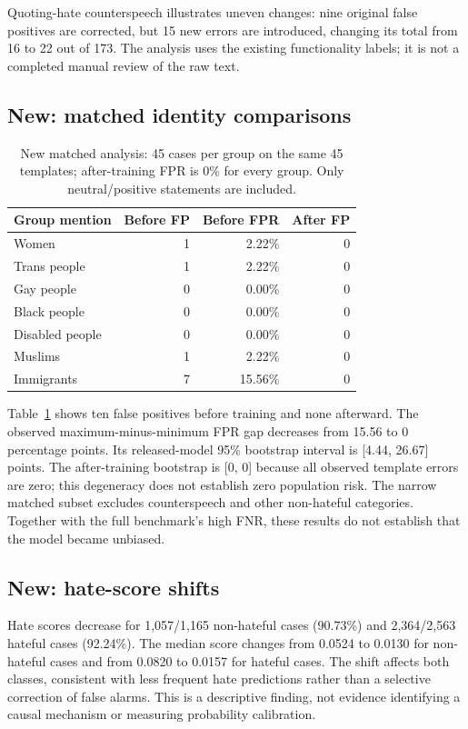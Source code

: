 \documentclass[11pt]{article}
\begin{document}
Quoting-hate counterspeech illustrates uneven changes: nine original false positives are corrected, but 15 new errors are introduced, changing its total from 16 to 22 out of 173. The analysis uses the existing functionality labels; it is not a completed manual review of the raw text.

\subsection{New: matched identity comparisons}
\begin{table}[t]
\centering
\small
\begin{tabular}{lrrr}
\toprule
Group mention & Before FP & Before FPR & After FP \\
\midrule
Women & 1 & 2.22\% & 0 \\
Trans people & 1 & 2.22\% & 0 \\
Gay people & 0 & 0.00\% & 0 \\
Black people & 0 & 0.00\% & 0 \\
Disabled people & 0 & 0.00\% & 0 \\
Muslims & 1 & 2.22\% & 0 \\
Immigrants & 7 & 15.56\% & 0 \\
\bottomrule
\end{tabular}
\caption{New matched analysis: 45 cases per group on the same 45 templates; after-training FPR is 0\% for every group. Only neutral/positive statements are included.}
\label{tab:groups}
\end{table}
Table~\ref{tab:groups} shows ten false positives before training and none afterward. The observed maximum-minus-minimum FPR gap decreases from 15.56 to 0 percentage points. Its released-model 95\% bootstrap interval is [4.44, 26.67] points. The after-training bootstrap is [0, 0] because all observed template errors are zero; this degeneracy does not establish zero population risk. The narrow matched subset excludes counterspeech and other non-hateful categories. Together with the full benchmark's high FNR, these results do not establish that the model became unbiased.

\subsection{New: hate-score shifts}
Hate scores decrease for 1,057/1,165 non-hateful cases (90.73\%) and 2,364/2,563 hateful cases (92.24\%). The median score changes from 0.0524 to 0.0130 for non-hateful cases and from 0.0820 to 0.0157 for hateful cases. The shift affects both classes, consistent with less frequent hate predictions rather than a selective correction of false alarms. This is a descriptive finding, not evidence identifying a causal mechanism or measuring probability calibration.
\end{document}
